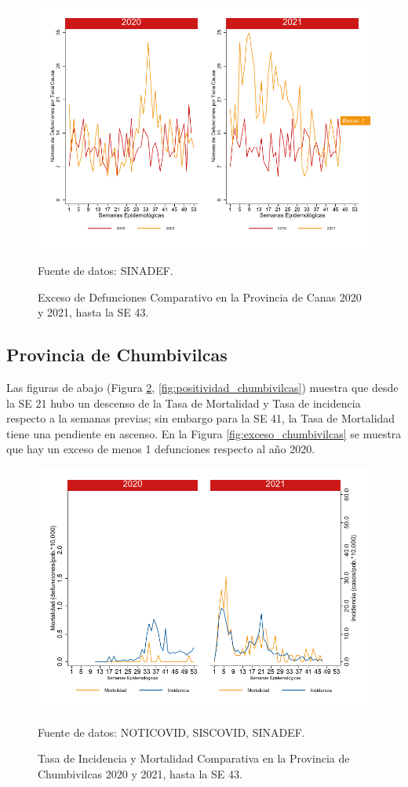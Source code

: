 \documentclass[12pt,a4paper,openany]{book}
\begin{document}
		\begin{figure}[h]
			\caption{Exceso de Defunciones Comparativo en la Provincia de Canas 2020 y 2021, hasta la SE 43.}\label{fig:exceso_canchis}
			\begin{center}
				\includegraphics[width=0.7\linewidth]{../figuras/exceso_5}
			\end{center}
			{\footnotesize {Fuente de datos: SINADEF.}}
		\end{figure}
		
		\clearpage
		
		\subsection*{Provincia de Chumbivilcas}
		\noindent Las figuras de abajo (Figura \ref{fig:inc_mort_chumbivilcas}, \ref{fig:positividad_chumbivilcas}) muestra que desde la SE 21 hubo un descenso de la Tasa de Mortalidad y Tasa de incidencia respecto a la semanas previas; sin embargo para la SE 41, la Tasa de Mortalidad tiene una pendiente en ascenso. En la Figura \ref{fig:exceso_chumbivilcas} se muestra que hay un exceso de menos 1 defunciones respecto al año 2020.
		
		\begin{figure}[h]
			\caption{Tasa de Incidencia y Mortalidad Comparativa en la Provincia de Chumbivilcas 2020 y 2021, hasta la SE 43.}\label{fig:inc_mort_chumbivilcas}
			\begin{center}
				\includegraphics[width=0.7\linewidth]{../figuras/incidencia_mortalidad_20_21_6}
			\end{center}
			{\footnotesize {Fuente de datos: NOTICOVID, SISCOVID, SINADEF.}}
		\end{figure}
		
\end{document}
